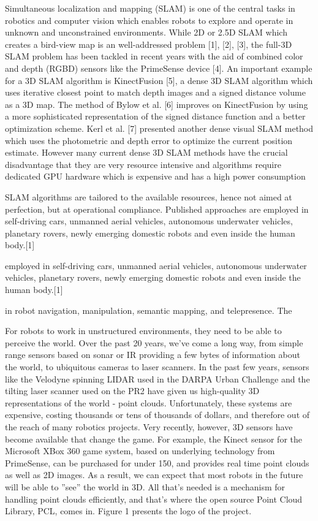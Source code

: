 	Simultaneous localization and mapping (SLAM) is one
	of the central tasks in robotics and computer vision which
	enables robots to explore and operate in unknown and
	unconstrained environments. While 2D or 2.5D SLAM which
	creates a bird-view map is an well-addressed problem [1],
	[2], [3], the full-3D SLAM problem has been tackled in
	recent years with the aid of combined color and depth (RGBD)
	sensors like the PrimeSense device [4]. An important
	example for a 3D SLAM algorithm is KinectFusion [5], a
	dense 3D SLAM algorithm which uses iterative closest point
	to match depth images and a signed distance volume as a 3D
	map. The method of Bylow et al. [6] improves on KinectFusion
	by using a more sophisticated representation of the
	signed distance function and a better optimization scheme.
	Kerl et al. [7] presented another dense visual SLAM method
	which uses the photometric and depth error to optimize
	the current position estimate. However many current dense
	3D SLAM methods have the crucial disadvantage that they
	are very resource intensive and algorithms require dedicated
	GPU hardware which is expensive and has a high power
	consumption
	

	SLAM algorithms are tailored to the available resources, hence not aimed at perfection, but at operational compliance. Published approaches are employed in self-driving cars, unmanned aerial vehicles, autonomous underwater vehicles, planetary rovers, newly emerging domestic robots and even inside the human body.[1]
	
	
	
	employed in self-driving cars, unmanned aerial vehicles, autonomous underwater vehicles, planetary rovers, newly emerging domestic robots and even inside the human body.[1]
	
	
	in robot navigation, manipulation, semantic
	mapping, and telepresence. The
	
For robots to work in unstructured environments, they need
to be able to perceive the world. Over the past 20 years,
we’ve come a long way, from simple range sensors based
on sonar or IR providing a few bytes of information about
the world, to ubiquitous cameras to laser scanners. In the
past few years, sensors like the Velodyne spinning LIDAR
used in the DARPA Urban Challenge and the tilting laser
scanner used on the PR2 have given us high-quality 3D
representations of the world - point clouds. Unfortunately,
these systems are expensive, costing thousands or tens of
thousands of dollars, and therefore out of the reach of many
robotics projects.
Very recently, however, 3D sensors have become available
that change the game. For example, the Kinect sensor for
the Microsoft XBox 360 game system, based on underlying
technology from PrimeSense, can be purchased for under
150, and provides real time point clouds as well as 2D
images. As a result, we can expect that most robots in the
future will be able to ”see” the world in 3D. All that’s
needed is a mechanism for handling point clouds efficiently,
and that’s where the open source Point Cloud Library, PCL,
comes in. Figure 1 presents the logo of the project.


